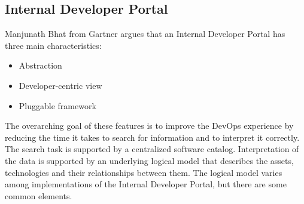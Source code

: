 \documentclass[a4paper,12pt]{article}
\begin{document}
    \subsection{Internal Developer Portal}
    \label{subsec:vpportal}
    Manjunath Bhat from Gartner argues that an Internal Developer Portal has three main characteristics\parencite{gartner}:
    \begin{itemize}
        \item Abstraction
        \item Developer-centric view
        \item Pluggable framework
    \end{itemize}
    The overarching goal of these features is to improve the DevOps experience by reducing the time it takes to search
    for information and to interpret it correctly.
    The search task is supported by a centralized software catalog.
    Interpretation of the data is supported by an underlying logical model that describes the assets, technologies
    and their relationships between them.
    The logical model varies among implementations of the Internal Developer Portal, but there are some common elements.
\end{document}
